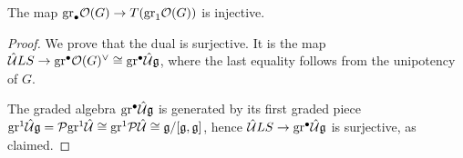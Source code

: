 \begin{prop}
The map $\mathrm{gr}_\bullet\mathcal{O}(G)\to T(\mathrm{gr}_1\mathcal{O}(G))$ is injective.
\end{prop}

\begin{proof}
We prove that the dual is surjective. It is the map $\hat{\mathcal{U}}LS\to\mathrm{gr}^\bullet\mathcal{O}(G)^\vee\cong\mathrm{gr}^\bullet \hat{\mathcal{U}}\mathfrak{g}$, where the last equality follows from the unipotency of $G$.

The graded algebra $\mathrm{gr}^\bullet \hat{\mathcal{U}}\mathfrak{g}$ is generated by its first graded piece $\mathrm{gr}^1 \hat{\mathcal{U}}\mathfrak{g}=\mathcal{P}\mathrm{gr}^1\hat{\mathcal{U}}\cong\mathrm{gr}^1\mathcal{P}\hat{\mathcal{U}}\cong\mathfrak{g}/[\mathfrak{g},\mathfrak{g}]$, hence $ \hat{\mathcal{U}}LS\to\mathrm{gr}^\bullet \hat{\mathcal{U}}\mathfrak{g}$ is surjective, as claimed.
\end{proof}
